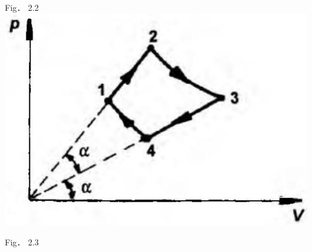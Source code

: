 \documentclass[10pt]{article}
\begin{document}
Fig． 2.2\\
\includegraphics[max width=\textwidth, center]{2025_07_01_5b3ff9fa0d508c8e9f17g-081(1)}

Fig． 2.3
\end{document}
